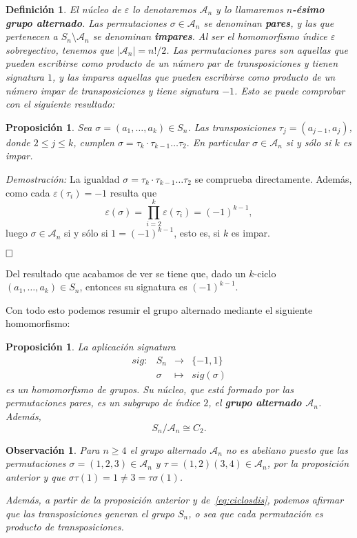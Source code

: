 \documentclass[12pt]{article}
\newtheorem{proposition}[theorem]{Proposición}
\newtheorem{definition}[theorem]{Definición}
\newtheorem{observation}{Observación}[theorem]
\begin{document}
\begin{definition}El núcleo de $\varepsilon$ lo denotaremos $\mathcal{A}_{n}$ y lo llamaremos \textbf{$n$-ésimo grupo alternado}. Las permutaciones $\sigma \in \mathcal{A}_{n}$ se denominan \textbf{pares}, y las que pertenecen a $S_{n} \setminus \mathcal{A}_{n}$ se denominan \textbf{impares}. Al ser el homomorfismo índice $\varepsilon$ sobreyectivo, tenemos que $|\mathcal{A}_{n}| = n!/2$. Las permutaciones pares son aquellas que pueden escribirse como producto de un número par de transposiciones y tienen signatura $1$, y las impares aquellas que pueden escribirse como producto de un número impar de transposiciones y tiene signatura $-1$. Esto se puede comprobar con el siguiente resultado:
\end{definition}

\begin{proposition}\label{eq:cicimpar} Sea $\sigma = (a_{1}, \ldots, a_{k}) \in S_{n}$. Las transposiciones $\tau_{j} = (a_{j-1}, a_{j})$, donde $2\leq j \leq k$, cumplen $\sigma = \tau_{k} \cdot \tau_{k-1} \ldots \tau_{2}.$ En particular $\sigma \in \mathcal{A}_{n}$ si y sólo si $k$ es impar.
\end{proposition}
\emph{Demostración: }La igualdad $\sigma = \tau_{k} \cdot \tau_{k-1} \ldots \tau_{2}$ se comprueba directamente. Además, como cada $\varepsilon(\tau_{i}) = -1$ resulta que $$\varepsilon(\sigma) = \prod_{i=2}^{k}\varepsilon(\tau_{i}) = (-1)^{k-1},$$ luego $\sigma \in \mathcal{A}_{n}$ si y sólo si $1 = (-1)^{k-1}$, esto es, si $k$ es impar.

$\hfill \square$

Del resultado que acabamos de ver se tiene que, dado un $k$-ciclo $(a_{1}, \ldots, a_{k}) \in S_{n}$, entonces su signatura es $(-1)^{k-1}$.

Con todo esto podemos resumir el grupo alternado mediante el siguiente homomorfismo:
\begin{proposition}La aplicación signatura $$\begin{array}{rccl}
sig \colon &S_{n}& \longrightarrow &\lbrace -1, 1\rbrace\\
&\sigma& \longmapsto &sig(\sigma)
\end{array}
$$
es un homomorfismo de grupos. Su núcleo, que está formado por las permutaciones pares, es un subgrupo de índice $2$, el \textbf{grupo alternado $\mathcal{A}_{n}$}. Además, $$S_{n}/\mathcal{A}_{n} \cong C_{2}.$$
\end{proposition}


\begin{observation} Para $n \geq 4$ el grupo alternado $\mathcal{A}_{n}$ no es abeliano puesto que las permutaciones $\sigma = (1,2,3) \in \mathcal{A}_{n}$ y $\tau = (1,2)(3,4) \in \mathcal{A}_{n}$, por la proposición anterior y que $\sigma\tau(1) = 1 \neq 3 = \tau\sigma(1)$.

Además, a partir de la proposición anterior y de~\ref{eq:ciclosdis}, podemos afirmar que las transposiciones generan el grupo $S_{n}$, o sea que cada permutación es producto de transposiciones.
\end{observation}
\end{document}
